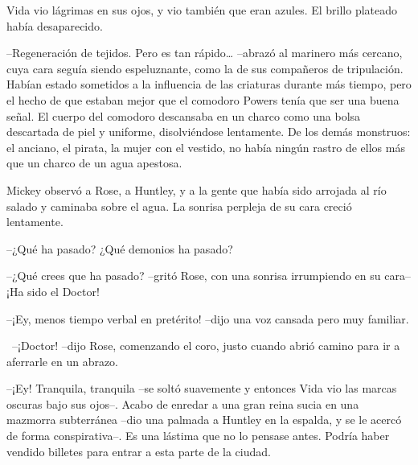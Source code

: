 {Vida vio lágrimas en sus ojos, y vio también que eran azules. El brillo
plateado había desaparecido.}

{--Regeneración de tejidos. Pero es tan rápido\ldots{} --abrazó al
 marinero más cercano, cuya cara seguía siendo espeluznante, como la de
 sus compañeros de tripulación. Habían estado sometidos a la influencia
 de las criaturas durante más tiempo, pero el hecho de que estaban mejor
 que el comodoro Powers tenía que ser una buena señal. El cuerpo del
 comodoro descansaba en un charco como una bolsa descartada de piel y
 uniforme, disolviéndose lentamente. De los demás monstruos: el anciano,
 el pirata, la mujer con el vestido, no había ningún rastro de ellos más
que un charco de un agua apestosa.}

{Mickey observó a Rose, a Huntley, y a la gente que había sido arrojada
 al río salado y caminaba sobre el agua. La sonrisa perpleja de su cara
creció lentamente.}

{--¿Qué ha pasado? ¿Qué demonios ha pasado?}

{--¿Qué crees que ha pasado? --gritó Rose, con una sonrisa irrumpiendo
en su cara-- ¡Ha sido el Doctor!}

{--¡Ey, menos tiempo verbal en pretérito! --dijo una voz cansada pero
muy familiar.}

{~--¡Doctor! --dijo Rose, comenzando el coro, justo cuando abrió camino
para ir a aferrarle en un abrazo.}

{--¡Ey! Tranquila, tranquila --se soltó suavemente y entonces Vida vio
 las marcas oscuras bajo sus ojos--. Acabo de enredar a una gran reina
 sucia en una mazmorra subterránea --dio una palmada a Huntley en la
 espalda, y se le acercó de forma conspirativa--. Es una lástima que no
 lo pensase antes. Podría haber vendido billetes para entrar a esta parte
de la ciudad.}
